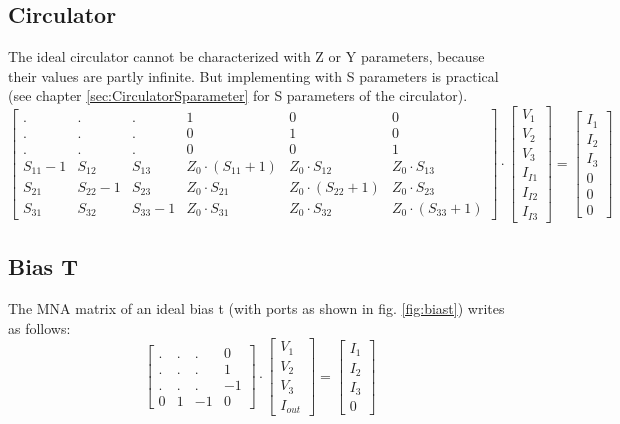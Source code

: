 \subsection{Circulator}

The ideal circulator cannot be characterized with Z or Y parameters,
because their values are partly infinite.  But implementing with S
parameters is practical (see chapter \ref{sec:CirculatorSparameter}
for S parameters of the circulator).
\begin{equation}
\begin{bmatrix}
 . & . & .  &  1 & 0 & 0\\
 . & . & .  &  0 & 1 & 0\\
 . & . & .  &  0 & 0 & 1\\
S_{11}-1 &  S_{12} & S_{13} & Z_0\cdot (S_{11}+1) & Z_0\cdot S_{12} & Z_0\cdot S_{13}\\
S_{21} &  S_{22}-1 & S_{23} & Z_0\cdot S_{21} & Z_0\cdot (S_{22}+1) & Z_0\cdot S_{23}\\
S_{31} &  S_{32} & S_{33}-1 & Z_0\cdot S_{31} & Z_0\cdot S_{32} & Z_0\cdot (S_{33}+1)
\end{bmatrix}
\cdot
\begin{bmatrix}
V_{1}\\
V_{2}\\
V_{3}\\
I_{I1}\\
I_{I2}\\
I_{I3}
\end{bmatrix}
=
\begin{bmatrix}
I_{1}\\
I_{2}\\
I_{3}\\
0\\
0\\
0
\end{bmatrix}
\end{equation}

\subsection{Bias T}

The MNA matrix of an ideal bias t (with ports as shown in
fig. \ref{fig:biast}) writes as follows:
\begin{equation}
\begin{bmatrix}
 . & . & .  &  0\\
 . & . & .  &  1\\
 . & . & .  & -1\\
 0 & 1 & -1 &  0
\end{bmatrix}
\cdot
\begin{bmatrix}
V_{1}\\
V_{2}\\
V_{3}\\
I_{out}
\end{bmatrix}
=
\begin{bmatrix}
I_{1}\\
I_{2}\\
I_{3}\\
0
\end{bmatrix}
\end{equation}

